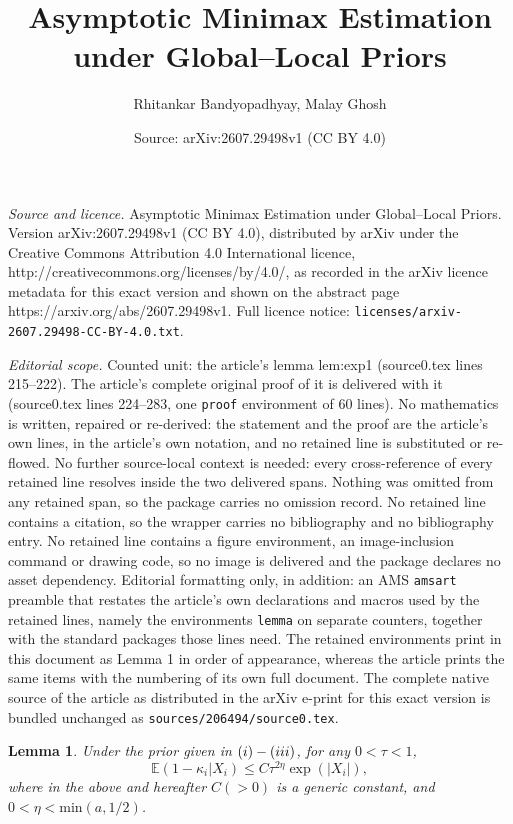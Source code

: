 \documentclass[10pt,a4paper]{amsart}
\title{Asymptotic Minimax Estimation under Global--Local Priors}
\author{Rhitankar Bandyopadhyay, Malay Ghosh}
\date{Source: arXiv:2607.29498v1 (CC BY 4.0)}
\newtheorem{lemma}{Lemma}
\begin{document}
\maketitle

\noindent\emph{Source and licence.} Asymptotic Minimax Estimation under Global--Local Priors. Version arXiv:2607.29498v1 (CC BY 4.0), distributed by arXiv under the Creative Commons Attribution 4.0 International licence, http://creativecommons.org/licenses/by/4.0/, as recorded in the arXiv licence metadata for this exact version and shown on the abstract page https://arxiv.org/abs/2607.29498v1. Full licence notice: \texttt{licenses/arxiv-2607.29498-CC-BY-4.0.txt}.\par\smallskip

\noindent\textit{Editorial scope.} Counted unit: the article's lemma lem:exp1 (source0.tex lines 215--222). The article's complete original proof of it is delivered with it (source0.tex lines 224--283, one \texttt{proof} environment of 60 lines). No mathematics is written, repaired or re-derived: the statement and the proof are the article's own lines, in the article's own notation, and no retained line is substituted or re-flowed.  No further source-local context is needed: every cross-reference of every retained line resolves inside the two delivered spans.  Nothing was omitted from any retained span, so the package carries no omission record.  No retained line contains a citation, so the wrapper carries no bibliography and no bibliography entry.  No retained line contains a figure environment, an image-inclusion command or drawing code, so no image is delivered and the package declares no asset dependency.  Editorial formatting only, in addition: an AMS \texttt{amsart} preamble that restates the article's own declarations and macros used by the retained lines, namely the environments \texttt{lemma} on separate counters, together with the standard packages those lines need.  The retained environments print in this document as Lemma 1 in order of appearance, whereas the article prints the same items with the numbering of its own full document.  The complete native source of the article as distributed in the arXiv e-print for this exact version is bundled unchanged as \texttt{sources/206494/source0.tex}.
\begin{lemma}\label{lem:exp1}
Under the prior given in $\textnormal{(i)-(iii)}$, for any $0<\tau<1$,
\[
\mathbb{E}(1-\kappa_i|X_i)\leq C\tau^{2\eta}\exp(|X_i|),
\]
where in the above and hereafter $C(>0)$ is a generic constant, and 
$0<\eta<\mbox{min}(a,1/2)$.\\
\end{lemma}
\end{document}
